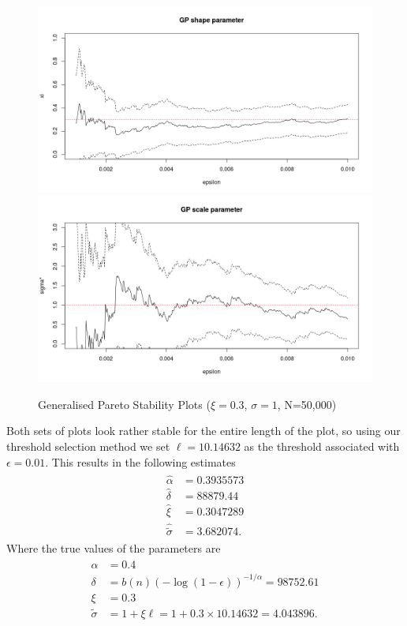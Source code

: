 \documentclass[honours,12pt]{unswthesis}
\newcommand{\1}{\mathbf 1}
\numberwithin{equation}{section}
\theoremstyle{definition}
\theoremstyle{remark}
\begin{document}
\begin{figure}[h]
    \centering
    \includegraphics[width=\textwidth]{Figures/GPshape01}
    \includegraphics[width=\textwidth]{Figures/GPscale01}
    \caption{Generalised Pareto Stability Plots ($\xi=0.3$, $\sigma=1$, N=50,000)}\label{fig:GPstability}
\end{figure}
Both sets of plots look rather stable for the entire length of the plot, so using our threshold selection method we set $\ell=10.14632$ as the threshold associated with $\epsilon=0.01$. This results in the following estimates
\begin{align}
\begin{split}\label{eq:parameterEstimates}
\hat \alpha &= 0.3935573\\
\hat \delta &= 88879.44\\ 
\hat \xi &=    0.3047289\\ 
\hat {\tilde \sigma} &= 3.682074.
\end{split}
\end{align}
Where the true values of the parameters are
\begin{align}
\begin{split}\label{eq:trueValues}
 \alpha &= 0.4\\
 \delta &= b(n)(-\log(1-\epsilon))^{-1/\alpha}=98752.61 \\
 \xi &= 0.3\\
 {\tilde \sigma} &= 1+\xi\ell =1+0.3\times 10.14632 = 4.043896.
 \end{split}
\end{align} 
\end{document}
